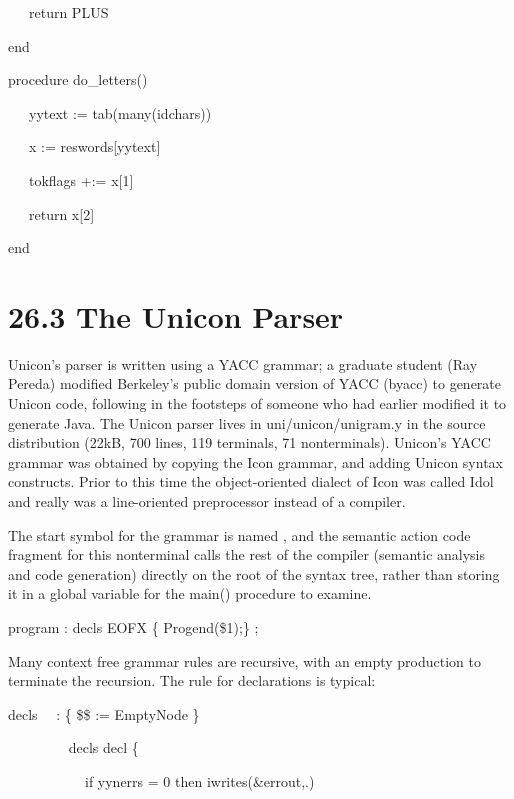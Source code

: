 {\ttfamily\mdseries
\ \ \ return PLUS}

{\ttfamily\mdseries
end}


\bigskip

{\ttfamily\mdseries
procedure do\_letters()}

{\ttfamily\mdseries
\ \ \ yytext {\textbar}{\textbar}:= tab(many(idchars))}

{\ttfamily\mdseries
\ \ \ x := reswords[yytext]}

{\ttfamily\mdseries
\ \ \ tokflags +:= x[1]}

{\ttfamily\mdseries
\ \ \ return x[2]}

{\ttfamily\mdseries
end}

\section[26.3 The Unicon Parser]{26.3 The Unicon Parser}

Unicon's parser is written using a YACC grammar; a graduate student
(Ray Pereda) modified Berkeley's public domain version of YACC (byacc)
to generate Unicon code, following in the footsteps of someone who had
earlier modified it to generate Java. The Unicon parser lives in
uni/unicon/unigram.y in the source distribution (22kB, 700 lines, 119
terminals, 71 nonterminals). Unicon's YACC grammar was obtained by
copying the Icon grammar, and adding Unicon syntax constructs. Prior
to this time the object-oriented dialect of Icon was called Idol and
really was a line-oriented preprocessor instead of a compiler.

The start symbol for the grammar is named
, and the semantic action code fragment
for this nonterminal calls the rest of the compiler (semantic analysis
and code generation) directly on the root of the syntax tree, rather
than storing it in a global variable for the main() procedure to
examine.

{\ttfamily\mdseries
program : decls EOFX \{ Progend(\$1);\} ;}


Many context free grammar rules are recursive, with an empty
production to terminate the recursion. The rule for declarations is
typical:

{\ttfamily\mdseries
decls \ \ : \{ \$\$ := EmptyNode \}}

{\ttfamily\mdseries
\ \ \ \ \ \ \ \ {\textbar} decls decl \{}

{\ttfamily\mdseries
\ \ \ \ \ \ \ \ \ \ \ if yynerrs = 0 then iwrites(\&errout,{\textquotedbl}.{\textquotedbl})}

